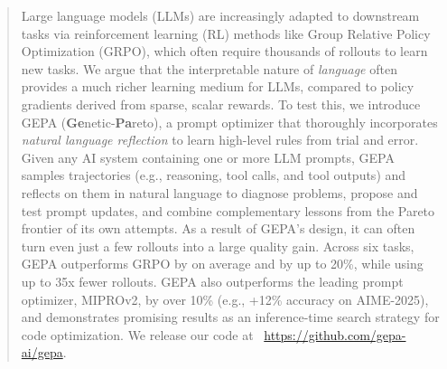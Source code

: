 \documentclass{article} %
\begin{document}
\begin{abstract}
    Large language models (LLMs) are increasingly adapted to downstream tasks via reinforcement learning (RL) methods like Group Relative Policy Optimization (GRPO), which often require thousands of rollouts to learn new tasks. We argue that the interpretable nature of \textit{language} often provides a much richer learning medium for LLMs, compared to policy gradients derived from sparse, scalar rewards. To test this, we introduce GEPA (\textbf{Ge}netic-\textbf{Pa}reto), a prompt optimizer that thoroughly incorporates \textit{natural language reflection} to learn high-level rules from trial and error.
    Given any AI system containing one or more LLM prompts, GEPA samples trajectories (e.g., reasoning, tool calls, and tool outputs) and reflects on them in natural language to diagnose problems, propose and test prompt updates, and combine complementary lessons from the Pareto frontier of its own attempts. As a result of GEPA's design, it can often turn even just a few rollouts into a large quality gain.
    Across six tasks, GEPA outperforms GRPO by  on average and by up to 20\%, while using up to 35x fewer rollouts. GEPA also outperforms the leading prompt optimizer, MIPROv2, by over 10\% (e.g., +12\% accuracy on AIME-2025), and demonstrates promising results as an inference-time search strategy for code optimization. We release our code at ~\url{https://github.com/gepa-ai/gepa}.
\end{abstract}
\vspace{-4mm}
\end{document}
